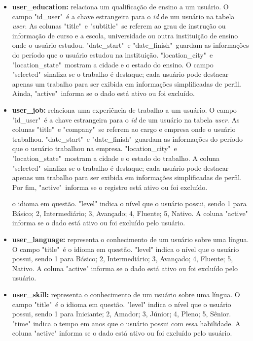 \documentclass[cic,tc]{iiufrgs}
\begin{document}
\begin{itemize}
    \item \textbf{user\_education:} relaciona um qualificação de ensino a um usuário. O campo "id\_user"\ é a chave estrangeira para o \textit{id} de um usuário na tabela \textit{user}. As colunas "title"\ e "subtitle"\ se referem ao grau de instrução ou informação de curso e a escola, universidade ou outra instituição de ensino onde o usuário estudou. "date\_start"\ e "date\_finish"\ guardam as informações do período que o usuário estudou na instituição. "location\_city"\ e "location\_state"\ mostram a cidade e o estado do ensino. O campo "selected"\ sinaliza se o trabalho é destaque; cada usuário pode destacar apenas um trabalho para ser exibida em informações simplificadas de perfil. Ainda, "active"\ informa se o dado está ativo ou foi excluído.
    
    \item \textbf{user\_job:} relaciona uma experiência de trabalho a um usuário. O campo "id\_user"\ é a chave estrangeira para o \textit{id} de um usuário na tabela \textit{user}. As colunas "title"\ e "company"\ se referem ao cargo e empresa onde o  usuário trabalhou. "date\_start"\ e "date\_finish"\ guardam as informações do período que o usuário trabalhou na empresa. "location\_city"\ e "location\_state"\ mostram a cidade e o estado do trabalho. A coluna "selected"\ sinaliza se o trabalho é destaque; cada usuário pode destacar apenas um trabalho para ser exibida em informações simplificadas de perfil. Por fim, "active"\ informa se o registro está ativo ou foi excluído.
    
    o idioma em questão. "level" indica o nível que o usuário possui, sendo 1 para Básico; 2, Intermediário; 3, Avançado; 4, Fluente; 5, Nativo. A coluna "active" informa se o dado está ativo ou foi excluído pelo usuário.
    
    \item \textbf{user\_language:} representa o conhecimento de um usuário sobre uma língua. O campo "title"\ é o idioma em questão. "level" indica o nível que o usuário possui, sendo 1 para Básico; 2, Intermediário; 3, Avançado; 4, Fluente; 5, Nativo. A coluna "active" informa se o dado está ativo ou foi excluído pelo usuário.
    
    \item \textbf{user\_skill:} representa o conhecimento de um usuário sobre uma língua. O campo "title"\ é o idioma em questão. "level" indica o nível que o usuário possui, sendo 1 para Iniciante; 2, Amador; 3, Júnior; 4, Pleno; 5, Sênior. "time" indica o tempo em anos que o usuário possui com essa habilidade. A coluna "active" informa se o dado está ativo ou foi excluído pelo usuário.
    
\end{itemize}
\end{document}
